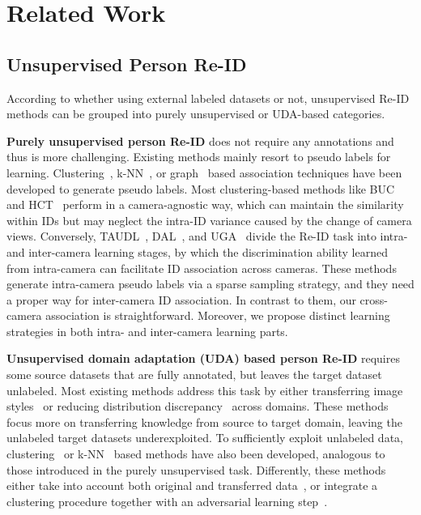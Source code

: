 \documentclass[letterpaper]{article} %
\begin{document}
\section{Related Work}
\subsection{Unsupervised Person Re-ID}
According to whether using external labeled datasets or not, unsupervised Re-ID methods can be grouped into purely unsupervised or UDA-based categories.

\textbf{Purely unsupervised person Re-ID} does not require any annotations and thus is more challenging. Existing methods mainly resort to pseudo labels for learning. Clustering~\cite{lin2019aBottom,zeng2020hierarchical}, k-NN~\cite{li2018unsupervised,chen2018deepa}, or graph~\cite{ye2017dynamic,wu2019graph} based association techniques have been developed to generate pseudo labels. Most clustering-based methods like BUC~\cite{lin2019aBottom} and HCT~\cite{zeng2020hierarchical} perform in a camera-agnostic way, which can maintain the similarity within IDs but may neglect the intra-ID variance caused by the change of camera views. Conversely, TAUDL~\cite{li2018unsupervised}, DAL~\cite{chen2018deepa}, and UGA~\cite{wu2019graph} divide the Re-ID task into intra- and inter-camera learning stages, by which the discrimination ability learned from intra-camera can facilitate ID association across cameras. These methods generate intra-camera pseudo labels via a sparse sampling strategy, and they need a proper way for inter-camera ID association. In contrast to them, our cross-camera association is straightforward. Moreover, we propose distinct learning strategies in both intra- and inter-camera learning parts.



\textbf{Unsupervised domain adaptation (UDA) based person Re-ID} requires some source datasets that are fully annotated, but leaves the target dataset unlabeled. Most existing methods address this task by either transferring image styles~\cite{Wei2018PTGAN,Deng2018SPGAN,Liu2019ATNet} or reducing distribution discrepancy~\cite{qi2019DA,Wu2019CA} across domains. These methods focus more on transferring knowledge from source to target domain, leaving the unlabeled target datasets underexploited. To sufficiently exploit unlabeled data, clustering~\cite{unsup_clustering, zhai2020ad, ge2020self} or k-NN~\cite{zhong2019invariance} based methods have also been developed, analogous to those introduced in the purely unsupervised task. Differently, these methods either take into account both original and transferred data~\cite{unsup_clustering,zhong2019invariance,ge2020self}, or integrate a clustering procedure together with an adversarial learning step~\cite{zhai2020ad}.
\end{document}
